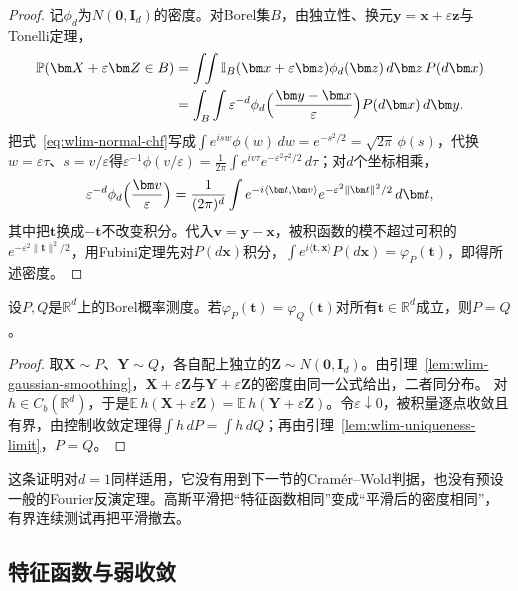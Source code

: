 \begin{proof}
记$\phi_d$为$N(\bm 0,\bm I_d)$的密度。对Borel集$B$，由独立性、换元$\bm y=\bm x+\varepsilon\bm z$与Tonelli定理，
\[
  \begin{aligned}
  \mathbb P(\bm X+\varepsilon\bm Z\in B)&=\int\!\!\int\mathbb I_B(\bm x+\varepsilon\bm z)\phi_d(\bm z)\,d\bm z\,P(d\bm x)\\
  &=\int_B\int\varepsilon^{-d}\phi_d\Bigl(\frac{\bm y-\bm x}\varepsilon\Bigr)P(d\bm x)\,d\bm y.
  \end{aligned}
\]
把式~\eqref{eq:wlim-normal-chf}写成$\int e^{isw}\phi(w)\,dw=e^{-s^2/2}=\sqrt{2\pi}\,\phi(s)$，代换$w=\varepsilon\tau$、$s=v/\varepsilon$得$\varepsilon^{-1}\phi(v/\varepsilon)=\frac1{2\pi}\int e^{iv\tau}e^{-\varepsilon^2\tau^2/2}\,d\tau$；对$d$个坐标相乘，
\[
  \varepsilon^{-d}\phi_d\Bigl(\frac{\bm v}\varepsilon\Bigr)=\frac1{(2\pi)^d}\int e^{-i\langle\bm t,\bm v\rangle}e^{-\varepsilon^2\lVert\bm t\rVert^2/2}\,d\bm t,
\]
其中把$\bm t$换成$-\bm t$不改变积分。代入$\bm v=\bm y-\bm x$，被积函数的模不超过可积的$e^{-\varepsilon^2\lVert\bm t\rVert^2/2}$，用Fubini定理先对$P(d\bm x)$积分，$\int e^{i\langle\bm t,\bm x\rangle}P(d\bm x)=\varphi_P(\bm t)$，即得所述密度。
\end{proof}

\begin{theorem}[特征函数的唯一性]
\label{thm:wlim-uniqueness}
设$P,Q$是$\mathbb R^d$上的Borel概率测度。若$\varphi_P(\bm t)=\varphi_Q(\bm t)$对所有$\bm t\in\mathbb R^d$成立，则$P=Q$。
\end{theorem}

\begin{proof}
取$\bm X\sim P$、$\bm Y\sim Q$，各自配上独立的$\bm Z\sim N(\bm 0,\bm I_d)$。由引理~\ref{lem:wlim-gaussian-smoothing}，$\bm X+\varepsilon\bm Z$与$\bm Y+\varepsilon\bm Z$的密度由同一公式给出，二者同分布。
对$h\in C_b(\mathbb R^d)$，于是$\mathbb E\,h(\bm X+\varepsilon\bm Z)=\mathbb E\,h(\bm Y+\varepsilon\bm Z)$。令$\varepsilon\downarrow0$，被积量逐点收敛且有界，由控制收敛定理得$\int h\,dP=\int h\,dQ$；再由引理~\ref{lem:wlim-uniqueness-limit}，$P=Q$。
\end{proof}

这条证明对$d=1$同样适用，它没有用到下一节的Cramér--Wold判据，也没有预设一般的Fourier反演定理。高斯平滑把“特征函数相同”变成“平滑后的密度相同”，有界连续测试再把平滑撤去。

\subsection{特征函数与弱收敛}

